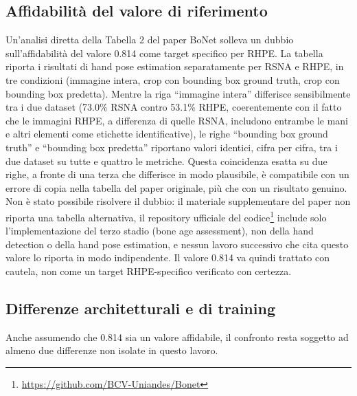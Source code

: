 \subsection{Affidabilità del valore di riferimento}
\label{sec:affidabilita_bonet}

Un'analisi diretta della Tabella 2 del paper BoNet solleva un dubbio
sull'affidabilità del valore 0.814 come target specifico per RHPE. La
tabella riporta i risultati di hand pose estimation separatamente per
RSNA e RHPE, in tre condizioni (immagine intera, crop con bounding box
ground truth, crop con bounding box predetta). Mentre la riga
``immagine intera'' differisce sensibilmente tra i due dataset (73.0\%
RSNA contro 53.1\% RHPE, coerentemente con il fatto che le immagini
RHPE, a differenza di quelle RSNA, includono entrambe le mani e altri
elementi come etichette identificative), le righe ``bounding box ground
truth'' e ``bounding box predetta'' riportano valori identici, cifra
per cifra, tra i due dataset su tutte e quattro le metriche. Questa
coincidenza esatta su due righe, a fronte di una terza che differisce in
modo plausibile, è compatibile con un errore di copia nella tabella del
paper originale, più che con un risultato genuino. Non è stato possibile
risolvere il dubbio: il materiale supplementare del paper non riporta
una tabella alternativa, il repository ufficiale del
codice\footnote{\url{https://github.com/BCV-Uniandes/Bonet}} include
solo l'implementazione del terzo stadio (bone age assessment), non
della hand detection o della hand pose estimation, e nessun lavoro
successivo che cita questo valore lo riporta in modo indipendente. Il
valore 0.814 va quindi trattato con cautela, non come un target
RHPE-specifico verificato con certezza.

\subsection{Differenze architetturali e di training}
\label{sec:differenze_architetturali_bonet}

Anche assumendo che 0.814 sia un valore affidabile, il confronto resta
soggetto ad almeno due differenze non isolate in questo lavoro.

